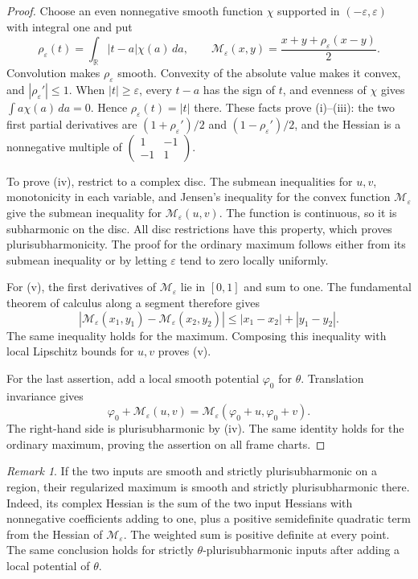 \documentclass[11pt,a4paper]{article}
\numberwithin{equation}{section}
\theoremstyle{definition}
\theoremstyle{remark}
\newtheorem{remark}[theorem]{Remark}
\newcommand{\R}{\mathbb R}
\begin{document}
\begin{proof}
Choose an even nonnegative smooth function $\chi$ supported in
$(-\varepsilon,\varepsilon)$ with integral one and put
\[
 \rho_\varepsilon(t)=\int_{\R}|t-a|\chi(a)\,da,
 \qquad
 \mathcal M_\varepsilon(x,y)=\frac{x+y+\rho_\varepsilon(x-y)}2.
\]
Convolution makes $\rho_\varepsilon$ smooth. Convexity of the absolute
value makes it convex, and $|\rho_\varepsilon'|\le1$. When
$|t|\ge\varepsilon$, every $t-a$ has the sign of $t$, and evenness of
$\chi$ gives $\int a\chi(a)\,da=0$. Hence
$\rho_\varepsilon(t)=|t|$ there. These facts prove (i)--(iii): the two
first partial derivatives are
$(1+\rho_\varepsilon')/2$ and $(1-\rho_\varepsilon')/2$, and the Hessian
is a nonnegative multiple of
$\left(\begin{smallmatrix}1&-1\\-1&1\end{smallmatrix}\right)$.

To prove (iv), restrict to a complex disc. The submean inequalities for
$u,v$, monotonicity in each variable, and Jensen's inequality for the
convex function $\mathcal M_\varepsilon$ give the submean inequality for
$\mathcal M_\varepsilon(u,v)$. The function is continuous, so it is
subharmonic on the disc. All disc restrictions have this property, which
proves plurisubharmonicity. The proof for the ordinary maximum follows
either from its submean inequality or by letting $\varepsilon$ tend to
zero locally uniformly.

For (v), the first derivatives of $\mathcal M_\varepsilon$ lie in $[0,1]$
and sum to one. The fundamental theorem of calculus along a segment
therefore gives
\[
 |\mathcal M_\varepsilon(x_1,y_1)-\mathcal M_\varepsilon(x_2,y_2)|
 \le |x_1-x_2|+|y_1-y_2|.
\]
The same inequality holds for the maximum. Composing this inequality
with local Lipschitz bounds for $u,v$ proves (v).

For the last assertion, add a local smooth potential $\varphi_0$ for
$\theta$. Translation invariance gives
\[
 \varphi_0+\mathcal M_\varepsilon(u,v)
 =\mathcal M_\varepsilon(\varphi_0+u,\varphi_0+v).
\]
The right-hand side is plurisubharmonic by (iv). The same identity holds
for the ordinary maximum, proving the assertion on all frame charts.
\end{proof}

\begin{remark}\label{pre:strict-max}
If the two inputs are smooth and strictly plurisubharmonic on a region,
their regularized maximum is smooth and strictly plurisubharmonic there.
Indeed, its complex Hessian is the sum of the two input Hessians with
nonnegative coefficients adding to one, plus a positive semidefinite
quadratic term from the Hessian of $\mathcal M_\varepsilon$. The weighted
sum is positive definite at every point. The same conclusion holds for
strictly $\theta$-plurisubharmonic inputs after adding a local potential
of $\theta$.
\end{remark}
\end{document}

